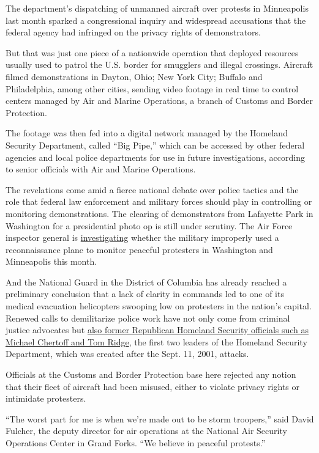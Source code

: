 The department's dispatching of unmanned aircraft over protests in
Minneapolis last month sparked a congressional inquiry and widespread
accusations that the federal agency had infringed on the privacy rights
of demonstrators.

But that was just one piece of a nationwide operation that deployed
resources usually used to patrol the U.S. border for smugglers and
illegal crossings. Aircraft filmed demonstrations in Dayton, Ohio; New
York City; Buffalo and Philadelphia, among other cities, sending video
footage in real time to control centers managed by Air and Marine
Operations, a branch of Customs and Border Protection.

The footage was then fed into a digital network managed by the Homeland
Security Department, called ``Big Pipe,'' which can be accessed by other
federal agencies and local police departments for use in future
investigations, according to senior officials with Air and Marine
Operations.

The revelations come amid a fierce national debate over police tactics
and the role that federal law enforcement and military forces should
play in controlling or monitoring demonstrations. The clearing of
demonstrators from Lafayette Park in Washington for a presidential photo
op is still under scrutiny. The Air Force inspector general is
\href{https://www.nytimes.com/2020/06/18/us/politics/investigation-military-surveillance-planes-george-floyd-protests.html}{investigating}
whether the military improperly used a reconnaissance plane to monitor
peaceful protesters in Washington and Minneapolis this month.

And the National Guard in the District of Columbia has already reached a
preliminary conclusion that a lack of clarity in commands led to one of
its medical evacuation helicopters swooping low on protesters in the
nation's capital. Renewed calls to demilitarize police work have not
only come from criminal justice advocates but
\href{https://www.nytimes.com/2020/06/17/us/politics/trump-protesters.html}{also
former Republican Homeland Security officials such as Michael Chertoff
and Tom Ridge}, the first two leaders of the Homeland Security
Department, which was created after the Sept. 11, 2001, attacks.

Officials at the Customs and Border Protection base here rejected any
notion that their fleet of aircraft had been misused, either to violate
privacy rights or intimidate protesters.

``The worst part for me is when we're made out to be storm troopers,''
said David Fulcher, the deputy director for air operations at the
National Air Security Operations Center in Grand Forks. ``We believe in
peaceful protests.''

